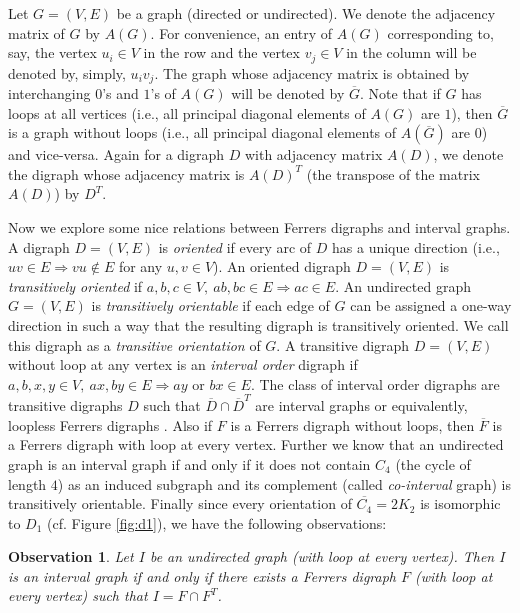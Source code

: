\documentclass[11pt]{article}
\newtheorem{obs}[thm]{Observation}
\theoremstyle{definition}
\theoremstyle{remark}
\numberwithin{equation}{section}
\begin{document}
\vspace{1em} Let $G=(V,E)$ be a graph (directed or undirected). We denote the adjacency matrix of $G$ by $A(G)$. For convenience, an entry of $A(G)$ corresponding to, say, the vertex $u_i\in V$ in the row and the vertex $v_j\in V$ in the column will be denoted by, simply, $u_iv_j$. The graph whose adjacency matrix is obtained by interchanging $0$'s and $1$'s of $A(G)$ will be denoted by $\overline{G}$. Note that if $G$ has loops at all vertices (i.e., all principal diagonal elements of $A(G)$ are $1$), then $\overline{G}$ is a graph without loops (i.e., all principal diagonal elements of $A(\overline{G})$ are $0$) and vice-versa. Again for a digraph $D$ with adjacency matrix $A(D)$, we denote the digraph whose adjacency matrix is $A(D)^T$ (the transpose of the matrix $A(D)$) by $D^T$.

\vspace{1em} Now we explore some nice relations between Ferrers digraphs and interval graphs. A digraph $D=(V,E)$ is {\em oriented} if every arc of $D$ has a unique direction (i.e., $uv\in E\Longrightarrow vu\notin E$ for any $u,v\in V$). An oriented digraph $D=(V,E)$ is {\em transitively oriented} if $a,b,c\in V,\ ab,bc\in E\Longrightarrow ac\in E$. An undirected graph $G=(V,E)$ is {\em transitively orientable} if each edge of $G$ can be assigned a one-way direction in such a way that the resulting digraph is transitively oriented. We call this digraph as a {\em transitive orientation} of $G$. A transitive digraph $D=(V,E)$ without loop at any vertex is an {\em interval order} digraph if $a,b,x,y\in V,\ ax, by\in E\Longrightarrow ay \textrm{ or } bx \in E$. The class of interval order digraphs are transitive digraphs $D$ such that $\overline{D}\cap\overline{D}^T$ are interval graphs \cite{Fi} or equivalently, loopless Ferrers digraphs \cite{P}. Also if $F$ is a Ferrers digraph without loops, then $\overline{F}$ is a Ferrers digraph with loop at every vertex. Further we know that an undirected graph is an interval graph if and only if it does not contain $C_4$ (the cycle of length $4$) as an induced subgraph and its complement (called {\em co-interval} graph) is transitively orientable.\cite{A} Finally since every orientation of $\overline{C_4}=2K_2$ is isomorphic to $D_1$ (cf. Figure \ref{fig:d1}), we have the following observations:

\begin{obs}\label{obs:alpha}
Let $I$ be an undirected graph (with loop at every vertex). Then $I$ is an interval graph if and only if there exists a Ferrers digraph $F$ (with loop at every vertex) such that $I=F\cap F^T$.
\end{obs}
\end{document}
